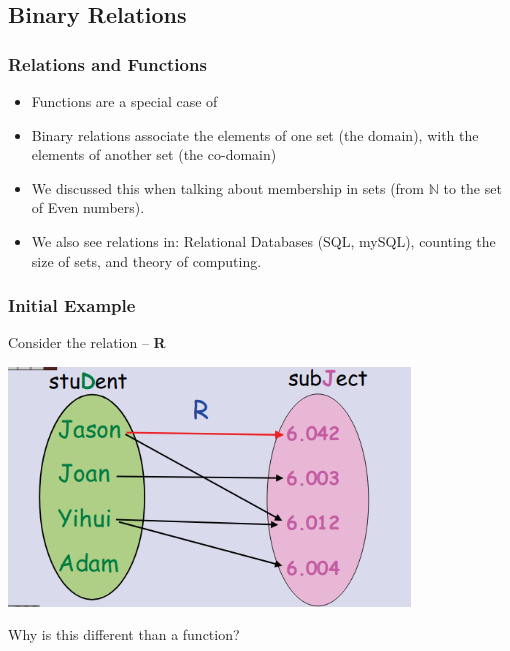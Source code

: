 \documentclass{beamer}
\begin{document}
\subsection{Binary Relations}
\begin{frame}
  \frametitle{Relations and Functions}

  {\larger
    \begin{itemize}
    \item Functions are a special case of 
    \item Binary relations associate the elements of one set
      (\alert{the domain}), with the elements of another set
      (\alert{the co-domain})

      \vfill

    \item We discussed this when talking about membership in sets
      (from $\mathbb{N}$ to the set of Even numbers).
    \item We also see relations in: Relational Databases (SQL, mySQL),
      counting the size of sets, and theory of computing.
    \end{itemize}
  }
\end{frame}

\begin{frame}
  \frametitle{Initial Example}

  {\larger
    Consider the relation  -- {\bf R}

    \begin{center}
      \includegraphics[width=0.8\textwidth]{../img/relations}
    \end{center}

    Why is this different than a function?
  }
\end{frame}
\end{document}
